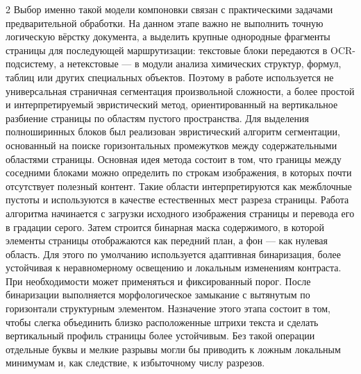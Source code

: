 \documentclass[11pt]{article}
\begin{document}
\begin{multicols}{2}
Выбор именно такой модели компоновки связан с практическими задачами предварительной обработки. На данном этапе важно не выполнить точную логическую вёрстку документа, а выделить крупные однородные фрагменты страницы для последующей маршрутизации: текстовые блоки передаются в OCR-подсистему, а нетекстовые --- в модули анализа химических структур, формул, таблиц или других специальных объектов. Поэтому в работе используется не универсальная страничная сегментация произвольной сложности, а более простой и интерпретируемый эвристический метод, ориентированный на вертикальное разбиение страницы по областям пустого пространства.
Для выделения полноширинных блоков был реализован эвристический алгоритм сегментации, основанный на поиске горизонтальных промежутков между содержательными областями страницы. Основная идея метода состоит в том, что границы между соседними блоками можно определить по строкам изображения, в которых почти отсутствует полезный контент. Такие области интерпретируются как межблочные пустоты и используются в качестве естественных мест разреза страницы.
Работа алгоритма начинается с загрузки исходного изображения страницы и перевода его в градации серого. Затем строится бинарная маска содержимого, в которой элементы страницы отображаются как передний план, а фон --- как нулевая область. Для этого по умолчанию используется адаптивная бинаризация, более устойчивая к неравномерному освещению и локальным изменениям контраста. При необходимости может применяться и фиксированный порог.
После бинаризации выполняется морфологическое замыкание с вытянутым по горизонтали структурным элементом. Назначение этого этапа состоит в том, чтобы слегка объединить близко расположенные штрихи текста и сделать вертикальный профиль страницы более устойчивым. Без такой операции отдельные буквы и мелкие разрывы могли бы приводить к ложным локальным минимумам и, как следствие, к избыточному числу разрезов.


\end{multicols}
\end{document}
